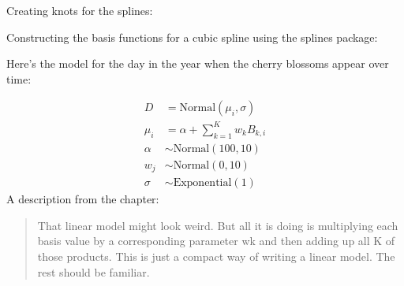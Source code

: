 \documentclass[
]{book}
\newenvironment{Shaded}{\begin{snugshade}}{\end{snugshade}}
\newcommand{\AttributeTok}[1]{\textcolor[rgb]{0.77,0.63,0.00}{#1}}
\newcommand{\CommentTok}[1]{\textcolor[rgb]{0.56,0.35,0.01}{\textit{#1}}}
\newcommand{\ConstantTok}[1]{\textcolor[rgb]{0.00,0.00,0.00}{#1}}
\newcommand{\DecValTok}[1]{\textcolor[rgb]{0.00,0.00,0.81}{#1}}
\newcommand{\FunctionTok}[1]{\textcolor[rgb]{0.00,0.00,0.00}{#1}}
\newcommand{\NormalTok}[1]{#1}
\newcommand{\OtherTok}[1]{\textcolor[rgb]{0.56,0.35,0.01}{#1}}
\newcommand{\SpecialCharTok}[1]{\textcolor[rgb]{0.00,0.00,0.00}{#1}}
\begin{document}
Creating knots for the splines:

\begin{Shaded}
\end{Shaded}

Constructing the basis functions for a cubic spline using the splines package:

\begin{Shaded}
\end{Shaded}

Here's the model for the day in the year when the cherry blossoms appear over time:

\[
\begin{aligned}
D &= \text{Normal}(\mu_i, \sigma)\\
\mu_i &= \alpha + \sum^K_{k=1}w_kB_{k,i}\\
\alpha &\sim \text{Normal}(100, 10) \\
w_j &\sim \text{Normal}(0, 10) \\
\sigma &\sim \text{Exponential}(1)
\end{aligned}
\]
A description from the chapter:

\begin{quote}
That linear model might look weird. But all it is doing is multiplying each basis value by a corresponding parameter wk and then adding up all K of those products. This is just a compact way of writing a linear model. The rest should be familiar.
\end{quote}
\end{document}
